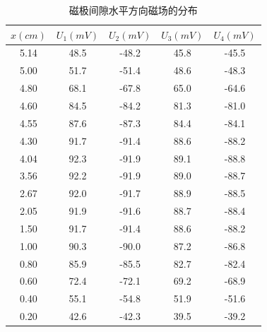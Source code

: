 \documentclass[12pt]{article}
\begin{document}
\begin{table}[H]
    \centering
    \begin{tabular}{|c|c|c|c|c|}
    \hline
    $x(cm)$ & $U_1(mV)$ & $U_2(mV)$ & $U_3(mV)$ & $U_4(mV)$ \\ \hline
    5.14    & 48.5      & -48.2     & 45.8      & -45.5     \\ \hline
    5.00    & 51.7      & -51.4     & 48.6      & -48.3     \\ \hline
    4.80    & 68.1      & -67.8     & 65.0      & -64.6     \\ \hline
    4.60    & 84.5      & -84.2     & 81.3      & -81.0     \\ \hline
    4.55    & 87.6      & -87.3     & 84.4      & -84.1     \\ \hline
    4.30    & 91.7      & -91.4     & 88.6      & -88.2     \\ \hline
    4.04    & 92.3      & -91.9     & 89.1      & -88.8     \\ \hline
    3.56    & 92.2      & -91.9     & 89.0      & -88.7     \\ \hline
    2.67    & 92.0      & -91.7     & 88.9      & -88.5     \\ \hline
    2.05    & 91.9      & -91.6     & 88.7      & -88.4     \\ \hline
    1.50    & 91.7      & -91.4     & 88.6      & -88.2     \\ \hline
    1.00    & 90.3      & -90.0     & 87.2      & -86.8     \\ \hline
    0.80    & 85.9      & -85.5     & 82.7      & -82.4     \\ \hline
    0.60    & 72.4      & -72.1     & 69.2      & -68.9     \\ \hline
    0.40    & 55.1      & -54.8     & 51.9      & -51.6     \\ \hline
    0.20    & 42.6      & -42.3     & 39.5      & -39.2     \\ \hline
    \end{tabular}
    \caption{磁极间隙水平方向磁场的分布}
    \label{tab:a3}
\end{table}
\end{document}
